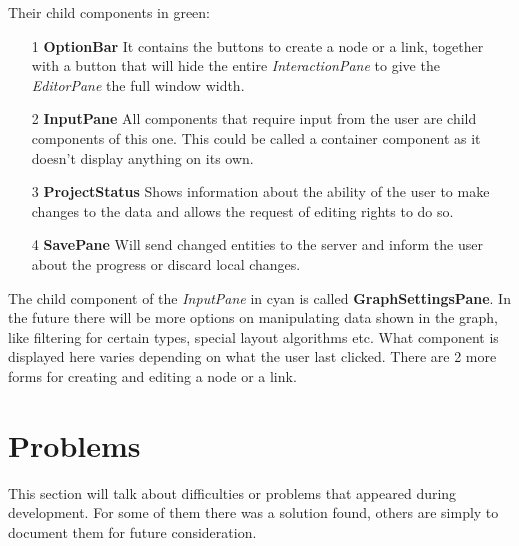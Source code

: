 Their child components in green:
\begin{itemize}
\item[1] \textbf{OptionBar} It contains the buttons to create a node or a link, together with a button that will hide the entire \emph{InteractionPane} to give the \emph{EditorPane} the full window width.
\item[2] \textbf{InputPane} All components that require input from the user are child components of this one. This could be called a container component as it doesn't display anything on its own.
\item[3] \textbf{ProjectStatus} Shows information about the ability of the user to make changes to the data and allows the request of editing rights to do so.
\item[4] \textbf{SavePane} Will send changed entities to the server and inform the user about the progress or discard local changes.
\end{itemize}

The child component of the \emph{InputPane} in cyan is called \textbf{GraphSettingsPane}. In the future there will be more options on manipulating data shown in the graph, like filtering for certain types, special layout algorithms etc. What component is displayed here varies depending on what the user last clicked. There are 2 more forms for creating and editing a node or a link.

\section{Problems}
This section will talk about difficulties or problems that appeared during development. For some of them there was a solution found, others are simply to document them for future consideration.

